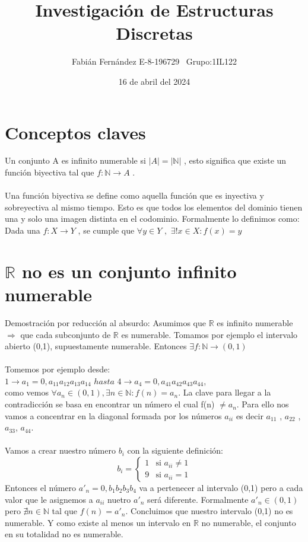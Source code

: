 \documentclass[]{article}
\title{Investigación de Estructuras Discretas}
\author{Fabián Fernández E-8-196729   \,\,\,Grupo:1IL122}
\date{16 de abril del 2024}
\begin{document}
	
	\maketitle
	\section*{Conceptos claves}
	Un conjunto A es infinito numerable si $\left| A \right| = \left| \mathbb{N}\right|$ , esto significa que existe un función biyectiva tal que $f: \mathbb{N} \rightarrow A$ .\\\\
	Una función biyectiva se define como aquella función que es inyectiva y sobreyectiva al mismo tiempo. Esto es que todos los elementos del dominio tienen una y solo una imagen distinta en el codominio. Formalmente lo definimos como: \\
	Dada una $f: X \rightarrow Y $ , se cumple que $\forall y \in Y \,\, ,\,\, \exists!x \in X : f(x) = y$
	
	
	\section*{$\mathbb{R}$ no es un conjunto infinito numerable}
	Demostración por reducción al absurdo: Asumimos que $\mathbb{R}$ es infinito numerable $\Rightarrow$ que cada subconjunto de $\mathbb{R}$ es numerable. Tomamos por ejemplo el intervalo abierto (0,1), supuestamente numerable. Entonces $\exists f:\mathbb{N} \rightarrow (0,1)$\\\\
	Tomemos por ejemplo desde:\\
	$1\rightarrow a_1 = 0,a_{11}a_{12}a_{13}a_{14} \,\, hasta\,\,4\rightarrow a_4 =0, a_{41}a_{42}a_{43}a_{44}$,\\como vemos $\forall a_n \in (0,1),  \exists n \in \mathbb{N} : f(n) = a_n$. La clave para llegar a la contradicción se basa en encontrar un número el cual f(n) $\neq a_n$. Para ello nos vamos a concentrar en la diagonal formada por los números $a_{ii}$ es decir $a_{11}$ , $a_{22}$ , $a_{33}$, $a_{44}$.
	\\\\
	Vamos a crear nuestro número $b_i$ con la siguiente definición: \[
	b_i =
	\begin{cases}
		1 & \text{si } a_{ii} \neq 1 \\
		9 & \text{si } a_{ii} = 1
	\end{cases}
	\]
	Entonces el número $a'_n = 0,b_1b_2b_3b_4$ va a pertenecer al intervalo (0,1) pero a cada valor que le asignemos a $a_{ii}$ nuetro $a'_n$ será diferente. Formalmente $a'_n \in (0,1)$ pero $\nexists n \in \mathbb{N}$ tal que $f(n) = a'_n$. Concluimos que nuestro intervalo (0,1) no es numerable. Y como existe al menos un intervalo en $\mathbb{R}$ no numerable, el conjunto en su totalidad no es numerable.
	
\end{document}
